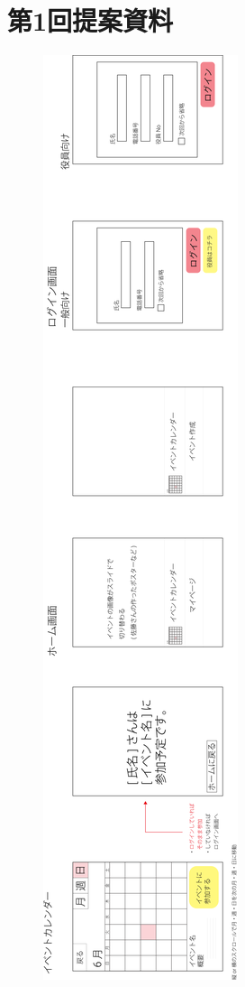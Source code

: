 \chapter{第1回提案資料}
\begin{figure}[ht]
    \begin{center}
      \includegraphics[keepaspectratio, scale=0.22]{appendixs/appendixA-1.png}
    \end{center}
\end{figure}


